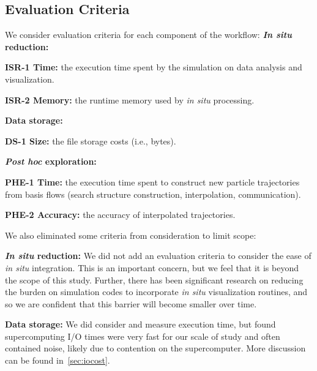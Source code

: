 \subsection{Evaluation Criteria}
\label{sec:eval}

We consider evaluation criteria for each component of the workflow:
\textbf{\textit{In situ} reduction:}
\begin{tightItemize}
\item \textbf{ISR-1 Time:} the execution time spent by the simulation on data analysis and visualization. 
\item \textbf{ISR-2 Memory:} the runtime memory used by \textit{in situ} processing. 
\end{tightItemize}
\textbf{Data storage:}
\begin{tightItemize}
\item \textbf{DS-1 Size:} the file storage costs (i.e., bytes). 
\end{tightItemize}
\textbf{\textit{Post hoc} exploration:}
\begin{tightItemize}
\item \textbf{PHE-1 Time:} the execution time spent to construct new particle trajectories from basis flows
(search structure construction, interpolation, communication).
\item \textbf{PHE-2 Accuracy:} the accuracy of interpolated trajectories.
\end{tightItemize}

\noindent
We also eliminated some criteria from consideration to limit scope:

\noindent
\textbf{\textit{In situ} reduction:}
We did not add an evaluation criteria to consider the ease of \textit{in situ}
integration.
%
This is an important concern, but we feel that it is beyond the scope
of this study. 
%
Further, there has been significant research on reducing the
burden on simulation codes to incorporate
\textit{in situ} visualization routines\cite{ayachit2016sensei,fogal2014freeprocessing,Larsen2017Ascent,liu2014hello,Vishwanath2011glean},
and so we are confident that this barrier will become
smaller over time.

\noindent
\textbf{Data storage:} We did consider and measure execution time, but found
supercomputing I/O times were very fast for our scale of study and often contained noise, likely due to contention on the supercomputer. 
More discussion can be found in~\ref{sec:iocost}.

